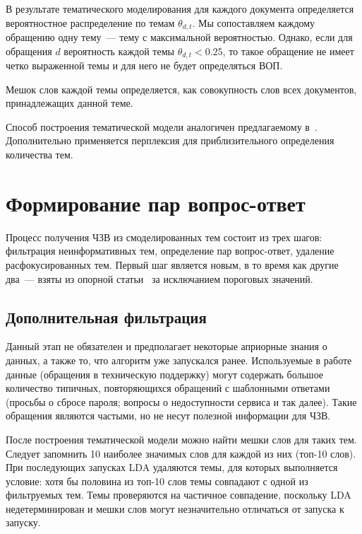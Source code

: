 В результате тематического моделирования для каждого документа определяется вероятностное распределение по темам $\theta_{d,t}$. Мы сопоставляем каждому обращению одну тему~--- тему с максимальной вероятностью. Однако, если для обращения $d$ вероятность каждой темы $\theta_{d,t}<0.25$, то такое обращение не имеет четко выраженной темы и для него не будет определяться ВОП.

Мешок слов каждой темы определяется, как совокупность слов всех документов, принадлежащих данной теме.

Способ построения тематической модели аналогичен предлагаемому в~\cite{original}. Дополнительно применяется перплексия для приблизительного определения количества тем.

\section{Формирование пар вопрос-ответ}
\label{sec:qaforming}

Процесс получения ЧЗВ из смоделированных тем состоит из трех шагов: фильтрация неинформативных тем, определение пар вопрос-ответ, удаление расфокусированных тем. Первый шаг является новым, в то время как другие два~--- взяты из опорной статьи~\cite{original} за исключанием пороговых значений.

\subsection{Дополнительная фильтрация}
\label{subsec:topicfilter}

Данный этап не обязателен и предполагает некоторые априорные знания о данных, а также то, что алгоритм уже запускался ранее. Используемые в работе данные (обращения в техническую поддержку) могут содержать большое количество типичных, повторяющихся обращений с шаблонными ответами (просьбы о сбросе пароля; вопросы о недоступности сервиса и так далее). Такие обращения являются частыми, но не несут полезной информации для ЧЗВ.

После построения тематической модели можно найти мешки слов для таких тем. Следует запомнить 10 наиболее значимых слов для каждой из них (топ-10 слов). При последующих запусках LDA удаляются темы, для которых выполняется условие: хотя бы половина из топ-10 слов темы совпадают с одной из фильтруемых тем. Темы проверяются на частичное совпадение, поскольку LDA недетерминирован и мешки слов могут незначительно отличаться от запуска к запуску.


